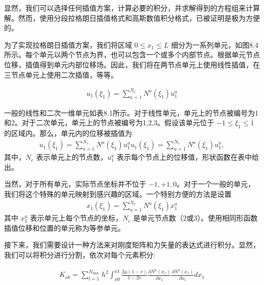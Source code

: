 \documentclass[12pt,a4paper]{book}
\begin{document}
显然，我们可以选择任何插值方案，计算必要的积分，并求解得到的方程组来计算解。然而，使用分段拉格朗日插值格式和高斯数值积分格式，已被证明是极为方便的。







为了实现拉格朗日插值方案，我们将区域 $ 0 \leq  x_1 \leq L $ 细分为一系列单元，如图8.4所示。每个单元以两个节点为界，也可以包含一个或多个内部节点。根据单元节点位移，插值得到单元内部位移场。因此，我们将在两节点单元上使用线性插值，在三节点单元上使用二次插值，等等。

\begin{equation*}
    \begin{aligned}
        u_{1}\left(\xi_{1}\right)=\sum_{a=1}^{N_{e}} N^{a}\left(\xi_{1}\right) u_{1}^{a}
    \end{aligned}
\end{equation*}


一般的线性和二次一维单元如表8.1所示。对于线性单元，单元上的节点被编号为1和2。对于二次单元，单元上的节点被编号为1,2,3。假设该单元位于 $-1 \leq \xi_1 \leq 1$ 的区域内。那么，单元内的位移被插值为
\begin{equation*}
    \begin{aligned}
        u_{1}\left(\xi_{1}\right)=\sum_{a=1}^{N_{e}} N^{a}\left(\xi_{1}\right) u_{1}^{a}u_{1}\left(\xi_{1}\right)=\sum_{a=1}^{N_{e}} N^{a}\left(\xi_{1}\right) u_{1}^{a},
    \end{aligned}
\end{equation*}
其中，$N_e$ 表示单元上的节点数，$u_1^a$ 表示每个节点上的位移值，形状函数在表中给出。


当然，对于所有单元，实际节点坐标并不位于 $-1, +1, 0$。对于一个一般的单元，我们将这个特殊的单元映射到感兴趣的区域。一个特别方便的方法是设置
\begin{equation*}
    \begin{aligned}
        x_{1}\left(\xi_{1}\right)=\sum_{a=1}^{N_{e}} N^{a}\left(\xi_{1}\right) x_{1}^{a}
    \end{aligned}
\end{equation*}
其中 $x_1^a$ 表示单元上每个节点的坐标，$N_e$ 是单元节点数（2或3）。使用相同形函数插值位移和位置的单元称为等参单元。

接下来，我们需要设计一种方法来对刚度矩阵和力矢量的表达式进行积分。显然，我们可以将积分进行分割，依次对每个元素积分:

\begin{equation*}
    \begin{aligned}
        K_{a b}=\sum_{l=1}^{N_{\text {lmn }}} h^{2} \int_{x 0}^{x 1} \frac{2 \mu(1-v)}{1-2 v} \frac{\partial N^{a}\left(x_{1}\right)}{\partial x_{1}} \frac{\partial N^{b}\left(x_{1}\right)}{\partial x_{1}} d x_{1}
    \end{aligned}
\end{equation*}
\end{document}
